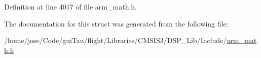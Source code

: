 Definition at line 4017 of file arm\-\_\-math.\-h.



The documentation for this struct was generated from the following file\-:\begin{DoxyCompactItemize}
\item 
/home/jose/\-Code/gui\-Tau/flight/\-Libraries/\-C\-M\-S\-I\-S3/\-D\-S\-P\-\_\-\-Lib/\-Include/\hyperlink{arm__math_8h}{arm\-\_\-math.\-h}\end{DoxyCompactItemize}
